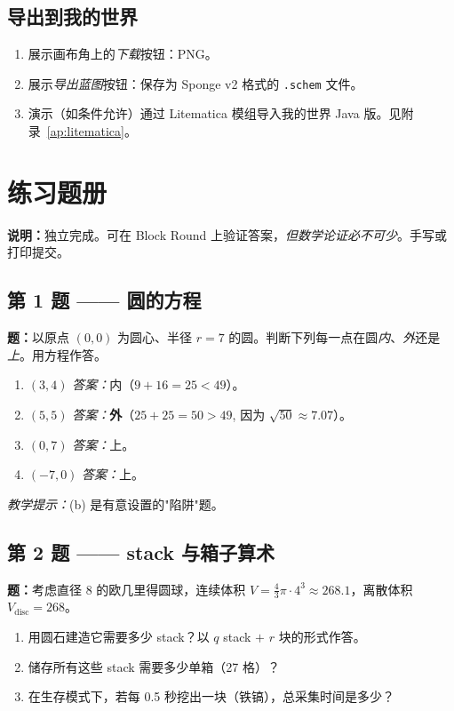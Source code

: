 \documentclass[12pt,a4paper]{scrartcl}
\newcommand{\acc}[1]{\textcolor{accent}{\textbf{#1}}}
\begin{document}
\subsection{导出到我的世界}
\begin{enumerate}[leftmargin=1.5em,itemsep=0.15em,topsep=0.3em]
  \item 展示画布角上的\emph{下载}按钮：PNG。
  \item 展示\emph{导出蓝图}按钮：保存为 Sponge v2 格式的 \texttt{.schem} 文件。
  \item 演示（如条件允许）通过 Litematica 模组导入我的世界 Java 版。见附录~\ref{ap:litematica}。
\end{enumerate}

\newpage
\section{练习题册}\label{ap:exerc}

\textbf{说明：}独立完成。可在 Block Round 上验证答案，\emph{但数学论证必不可少}。手写或打印提交。

\subsection*{第 1 题 —— 圆的方程}
\textbf{题：}以原点 $(0, 0)$ 为圆心、半径 $r = 7$ 的圆。判断下列每一点在圆\emph{内}、\emph{外}还是\emph{上}。用方程作答。
\begin{enumerate}[label=\alph*),leftmargin=1.5em,itemsep=0.1em,topsep=0.2em,nosep]
  \item $(3, 4)$ \hfill \emph{答案：}内（$9 + 16 = 25 < 49$）。
  \item $(5, 5)$ \hfill \emph{答案：}\acc{外}（$25 + 25 = 50 > 49$, 因为 $\sqrt{50} \approx 7.07$）。
  \item $(0, 7)$ \hfill \emph{答案：}上。
  \item $(-7, 0)$ \hfill \emph{答案：}上。
\end{enumerate}

\textit{教学提示：}(b) 是有意设置的"陷阱"题。

\subsection*{第 2 题 —— stack 与箱子算术}
\textbf{题：}考虑直径 8 的欧几里得圆球，连续体积 $V = \tfrac{4}{3}\pi \cdot 4^3 \approx 268.1$，离散体积 $V_{\mathrm{disc}} = 268$。
\begin{enumerate}[label=\alph*),leftmargin=1.5em,itemsep=0.1em,topsep=0.2em,nosep]
  \item 用圆石建造它需要多少 stack？以 $q$ stack $+$ $r$ 块的形式作答。
  \item 储存所有这些 stack 需要多少单箱（27 格）？
  \item 在生存模式下，若每 0.5 秒挖出一块（铁镐），总采集时间是多少？
\end{enumerate}
\end{document}
